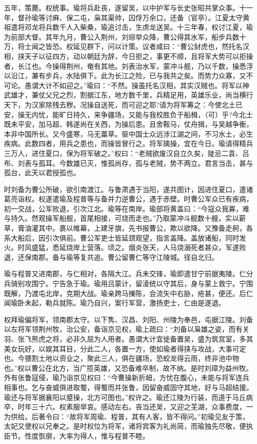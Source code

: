 \documentclass[12pt,UTF8]{ctexbook}
\begin{document}
五年，策薨。权统事。瑜将兵赴丧，遂留吴，以中护军与长史张昭共掌众事。十一年，督孙瑜等讨麻、保二屯，枭其渠帅，囚俘万余口，还备（官亭）。江夏太守黄祖遣将邓龙将兵数千人入柴桑，瑜追讨击，生虏龙送吴。十三年春，权讨江夏，瑜为前部大督。其年九月，曹公入荆州，刘琮举众降，曹公得其水军，船步兵数十万，将士闻之皆恐。权延见群下，问以计策。议者咸曰：“曹公豺虎也，然托名汉相，挟天子以征四方，动以朝廷为辞，今日拒之，事更不顺，且将军大势可以拒操者，长江也。今操得荆州，奄有其地。刘表治水军，蒙冲斗舰，乃以千数，操悉浮以沿江，兼有步兵，水陆俱下。此为长江之险，已与我共之矣。而势力众寡，又不可论。愚谓大计不如迎之。”瑜曰：“不然。操虽托名汉相，其实汉贼也。将军以神武雄才，兼仗父兄之烈，割据江东，地方数千里，兵精足用，英雄乐业，尚当横行天下，为汉家除残去秽。况操自送死，而可迎之耶?请为将军筹之：今使北土已安，操无内忧，能旷日持久，来争疆场，又能与我校胜负于船楫，（可）乎?今北土既未平安，加马超、韩遂尚在关西，为操后患。且舍鞍马，仗舟揖，与吴越争衡，本非中国所长。又今盛寒，马无藁草。驱中国士众远涉江湖之间，不习水土，必生疾病。此数四者，用兵之患也，而操皆冒行之。将军擒操，宜在今日。瑜请得精兵三万人，进住夏口，保为将军破之。”权曰：“老贼欲废汉自立久矣，陡忌二袁、吕布、刘表与孤耳。今数雄已灭，惟孤尚存，孤与老贼，势不两立。君言当击，甚与孤台，此天以君授孤也。

时刘备为曹公所破，欲引南渡江。与鲁肃遇于当阳，遂共图计，因进住夏口，遣诸葛亮诣权。权遂遣瑜及程普等与备并力逆曹公，遇于赤壁。时曹公军众已有疾病，初一交战，公军败退，引次江北。瑜等在南岸。瑜部将黄盖曰：“今寇众我寡，难与持久。然观操军船舰，首尾相接，可烧而走也。”乃取蒙冲斗舰数十艘，实以薪草，膏油灌其中。裹以帷幕，上建牙旗，先书报曹公，欺以欲降。又豫备走舸，各系大船后，因引次俱前。曹公军吏士皆延颈观望，指言盖降。盖放诸船，同时发火。时风盛猛，悉延烧岸上营落。顷之。烟炎张天，人马烧溺死者甚众，军遂败退，还保南郡。备与瑜等复共追。曹公留曹仁等守江陵城。径自北归。

瑜与程普又进南郡，与仁相对，各隔大江。兵未交锋，瑜即遣甘宁前据夷陵。仁分兵骑别攻围宁。宁告急于瑜。瑜用吕蒙计，留淩统以守其后，身与蒙上救宁。宁围既解，乃渡屯北岸，克期大战。瑜亲跨马擽陈，会流矢中右胁，疮甚，便还。后仁闻瑜卧未起，勒兵就陈。瑜乃自兴，案行军营，激扬吏士，仁由是遂退。

权拜瑜偏将军，领南郡太守。以下隽、汉昌、刘阳、州陵为奉邑，屯据江陵。刘备以左将军领荆州牧，治公安，备诣京见权，瑜上疏曰：“刘备以枭雄之姿，而有关羽、张飞熊虎之将，必非久屈为人用者。愚谓大计宜徙备置吴，盛为筑宫室，多其美女玩好，以娱其耳目，分此二人，各置一方，使如瑜者得挟与攻战，大事可定也。今猥割土地以资业之，聚此三人，俱在疆场，恐蛟龙得云雨，终非池中物也。”权以曹公在北方，当广揽英雄，又恐备难卒制，故不纳。是时刘璋为益州牧。外有张鲁寇侵，瑜乃诣京见权曰：“今曹操新折衄，方忧在腹心，未能与将军连兵相事也。乞与奋威俱进取蜀，得蜀而并张鲁，因留奋威固守其地，好与马超结援。瑜还与将军据襄阳以蹙操，北方可图也。”权许之。瑜还江陵为行装，而道于马丘病卒，时年三十六。权素服举哀。感动左右。丧当还吴，又迎之芜湖，众事费度，一为供给。后著令曰：“故将军周瑜、程普，其有人客，皆不得问。”初瑜见友于策，太妃又使权以兄奉之。是时权位为将军，诸将宾客为礼尚简，而瑜独先尽敬，便执臣节。性度恢廓，大率为得人，惟与程普不睦。
\end{document}
